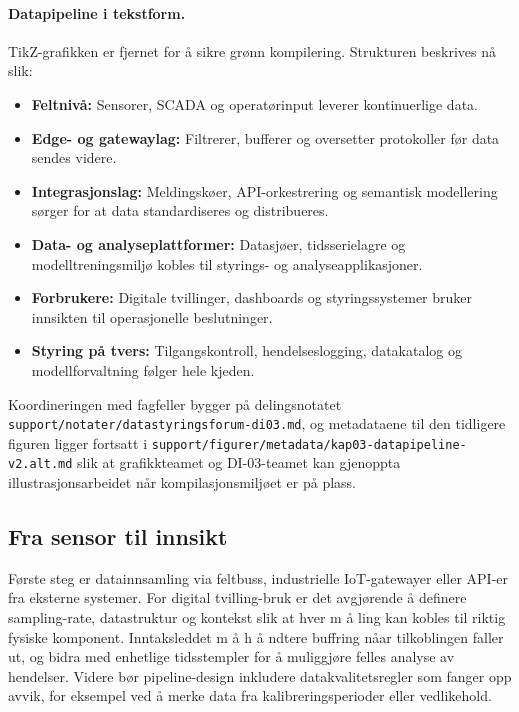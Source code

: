 \paragraph{Datapipeline i tekstform.} TikZ-grafikken er fjernet for å sikre grønn kompilering. Strukturen beskrives nå slik:
\begin{itemize}
    \item \textbf{Feltnivå:} Sensorer, SCADA og operatørinput leverer kontinuerlige data.
    \item \textbf{Edge- og gatewaylag:} Filtrerer, bufferer og oversetter protokoller før data sendes videre.
    \item \textbf{Integrasjonslag:} Meldingskøer, API-orkestrering og semantisk modellering sørger for at data standardiseres og distribueres.
    \item \textbf{Data- og analyseplattformer:} Datasjøer, tidsserielagre og modelltreningsmiljø kobles til styrings- og analyseapplikasjoner.
    \item \textbf{Forbrukere:} Digitale tvillinger, dashboards og styringssystemer bruker innsikten til operasjonelle beslutninger.
    \item \textbf{Styring på tvers:} Tilgangskontroll, hendelseslogging, datakatalog og modellforvaltning følger hele kjeden.
\end{itemize}

Koordineringen med fagfeller bygger på delingsnotatet \texttt{support/notater/datastyringsforum-di03.md}, og metadataene til den tidligere figuren ligger fortsatt i \texttt{support/figurer/metadata/kap03-datapipeline-v2.alt.md} slik at grafikkteamet og DI-03-teamet kan gjenoppta illustrasjonsarbeidet når kompilasjonsmiljøet er på plass.

\subsection{Fra sensor til innsikt}
Første steg er datainnsamling via feltbuss, industrielle IoT-gatewayer eller API-er fra eksterne systemer. For digital tvilling-bruk er det avgjørende  å definere sampling-rate, datastruktur og kontekst slik at hver m å ling kan kobles til riktig fysiske komponent. Inntaksleddet m å h å ndtere buffring nåar tilkoblingen faller ut, og bidra med enhetlige tidsstempler for  å muliggjøre felles analyse av hendelser. Videre bør pipeline-design inkludere datakvalitetsregler som fanger opp avvik, for eksempel ved  å merke data fra kalibreringsperioder eller vedlikehold.

